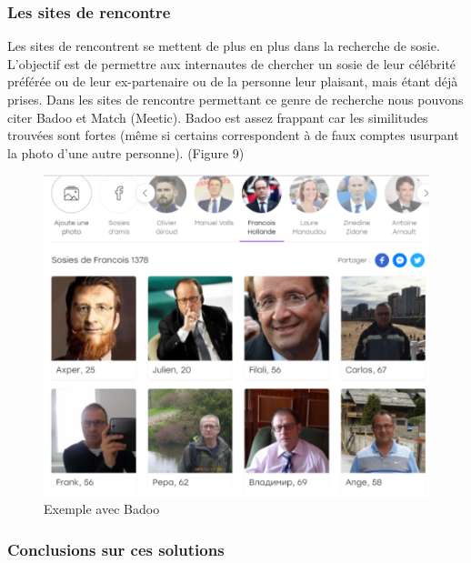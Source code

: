 \documentclass[a4paper,12pt]{article}
\begin{document}
\subsubsection{Les sites de rencontre}
Les sites de rencontrent se mettent de plus en plus dans la recherche de sosie. L'objectif est de permettre aux internautes de chercher un sosie de leur célébrité préférée ou de leur ex-partenaire ou de la personne leur plaisant, mais étant déjà prises. Dans les sites de rencontre permettant ce genre de recherche nous pouvons citer Badoo et Match (Meetic). 
Badoo est assez frappant car les similitudes trouvées sont fortes (même si certains correspondent à de faux comptes usurpant la photo d'une autre personne). (Figure 9)
\begin{figure}[!ht]
    \centering
        \includegraphics[scale=1]{images/badoo.PNG}
        \caption{Exemple avec Badoo}
    \end{figure}
    
\subsubsection{Conclusions sur ces solutions}
\end{document}
